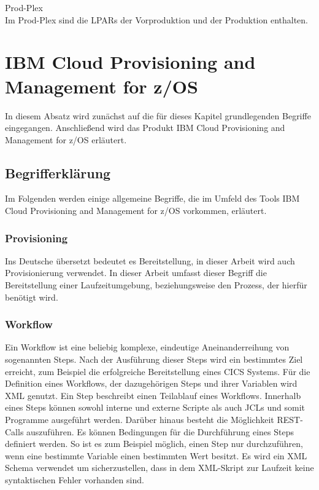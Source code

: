\glqq Prod-Plex\grqq\\
Im Prod-Plex sind die LPARs der Vorproduktion und der Produktion enthalten.

\section{IBM Cloud Provisioning and Management for z/OS}\label{sec:zosmf}
In diesem Absatz wird zunächst auf die für dieses Kapitel grundlegenden Begriffe eingegangen.
Anschließend wird das Produkt \glqq IBM Cloud Provisioning and Management for z/OS\grqq{} erläutert.

\subsection{Begrifferklärung}
Im Folgenden werden einige allgemeine Begriffe, die im Umfeld des Tools \glqq IBM Cloud Provisioning and Management for z/OS\grqq{} vorkommen, erläutert.

\subsubsection{Provisioning}
Ins Deutsche übersetzt bedeutet es Bereitstellung, in dieser Arbeit wird auch Provisionierung verwendet.
In dieser Arbeit umfasst dieser Begriff die Bereitstellung einer Laufzeitumgebung, beziehungsweise den Prozess, der hierfür benötigt wird.

\subsubsection{Workflow}\label{sssec:workflow}
Ein Workflow ist eine beliebig komplexe, eindeutige Aneinanderreihung von sogenannten Steps.
Nach der Ausführung dieser Steps wird ein bestimmtes Ziel erreicht, zum Beispiel die erfolgreiche Bereitstellung eines CICS Systems.
Für die Definition eines Workflows, der dazugehörigen Steps und ihrer Variablen wird XML genutzt.
Ein Step beschreibt einen Teilablauf eines Workflows.
Innerhalb eines Steps können sowohl interne und externe Scripte als auch JCLs und somit Programme ausgeführt werden.
Darüber hinaus besteht die Möglichkeit REST-Calls auszuführen.
Es können Bedingungen für die Durchführung eines Steps definiert werden.
So ist es zum Beispiel möglich, einen Step nur durchzuführen, wenn eine bestimmte Variable einen bestimmten Wert besitzt.
Es wird ein XML Schema verwendet um sicherzustellen, dass in dem XML-Skript zur Laufzeit keine syntaktischen Fehler vorhanden sind.
\cite{Rotthove.2018}

